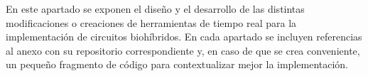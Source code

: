 
En este apartado se exponen el diseño y el desarrollo de las distintas modificaciones o creaciones de herramientas de tiempo real para la implementación de circuitos biohíbridos. En cada apartado se incluyen referencias al anexo con su repositorio correspondiente y, en caso de que se crea conveniente, un pequeño fragmento de código para contextualizar mejor la implementación.
